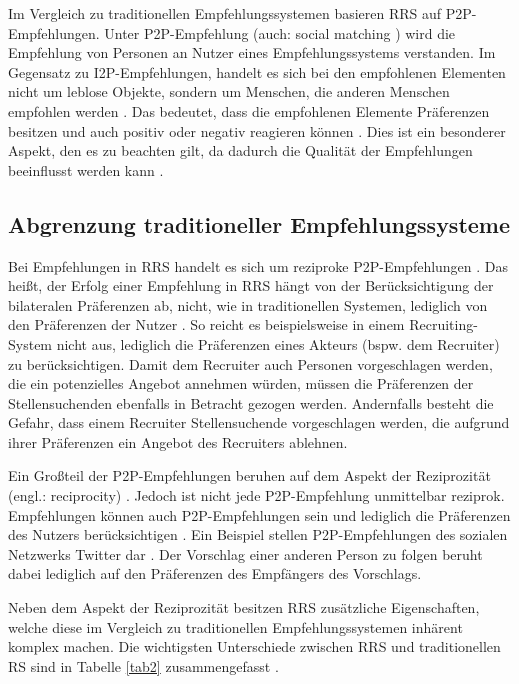 Im Vergleich zu traditionellen Empfehlungssystemen basieren RRS auf P2P-Empfehlungen.
Unter P2P-Empfehlung (auch: social matching \cite[S. 208]{pizzato:2010}) wird die Empfehlung von Personen an Nutzer eines Empfehlungssystems verstanden.
Im Gegensatz zu I2P-Empfehlungen, handelt es sich bei den empfohlenen Elementen nicht um leblose Objekte, sondern um Menschen, die anderen Menschen empfohlen werden \cite[S. 2]{kazienko:inbook}.
Das bedeutet, dass die empfohlenen Elemente Präferenzen besitzen und auch positiv oder negativ reagieren können \cite[S. 2]{kazienko:inbook}.
Dies ist ein besonderer Aspekt, den es zu beachten gilt, da dadurch die Qualität der Empfehlungen beeinflusst werden kann \cite[S. 208]{pizzato:2010}\cite[S. 2199]{akehurst:inproceedings}.

\subsection{Abgrenzung traditioneller Empfehlungssysteme}
\label{ch:empfehlungssysteme:rrs:traditional_vs_rrs}
Bei Empfehlungen in RRS handelt es sich um reziproke P2P-Empfehlungen \cite[S. 207]{pizzato:2010}.
Das heißt, der Erfolg einer Empfehlung in RRS hängt von der Berücksichtigung der bilateralen Präferenzen ab, nicht, wie in traditionellen Systemen, lediglich von den Präferenzen der Nutzer \cite[S. 1468]{yildirim:article}.
So reicht es beispielsweise in einem Recruiting-System nicht aus, lediglich die Präferenzen eines Akteurs (bspw. dem Recruiter) zu berücksichtigen.
Damit dem Recruiter auch Personen vorgeschlagen werden, die ein potenzielles Angebot annehmen würden, müssen die Präferenzen der Stellensuchenden ebenfalls in Betracht gezogen werden.
Andernfalls besteht die Gefahr, dass einem Recruiter Stellensuchende vorgeschlagen werden, die aufgrund ihrer Präferenzen ein Angebot des Recruiters ablehnen.

Ein Großteil der P2P-Empfehlungen beruhen auf dem Aspekt der Reziprozität (engl.: reciprocity) \cite[S. 545]{koprinska:inbook}.
Jedoch ist nicht jede P2P-Empfehlung unmittelbar reziprok.
Empfehlungen können auch P2P-Empfehlungen sein und lediglich die Präferenzen des Nutzers berücksichtigen \cite[S. 2429]{palomares:inproceedings}.
Ein Beispiel stellen P2P-Empfehlungen des sozialen Netzwerks Twitter dar \cite[S. 2429]{palomares:inproceedings}.
Der Vorschlag einer anderen Person zu folgen beruht dabei lediglich auf den Präferenzen des Empfängers des Vorschlags.

Neben dem Aspekt der Reziprozität besitzen RRS zusätzliche Eigenschaften, welche diese im Vergleich zu traditionellen Empfehlungssystemen inhärent komplex machen\cite[S. 2429]{palomares:inproceedings}\cite[S. 35]{li:inproceedings}\cite[S. 207]{pizzato:2010}.
Die wichtigsten Unterschiede zwischen RRS und traditionellen RS sind in Tabelle \ref{tab2} zusammengefasst \cite[S. 546]{koprinska:inbook}.

